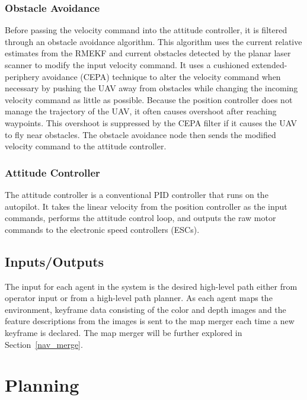 \documentclass[letterpaper, 10 pt, conference]{ieeeconf}  %
\begin{document}
\subsubsection{Obstacle Avoidance} \label{obs_avoid}

Before passing the velocity command into the attitude controller, it is filtered through an obstacle avoidance algorithm. This algorithm uses the current relative estimates from the RMEKF and current obstacles detected by the planar laser scanner to modify the input velocity command. It uses a cushioned extended-periphery avoidance (CEPA) technique \cite{Jackson2016} to alter the velocity command when necessary by pushing the UAV away from obstacles while changing the incoming velocity command as little as possible. Because the position controller does not manage the trajectory of the UAV, it often causes overshoot after reaching waypoints. This overshoot is suppressed by the CEPA filter if it causes the UAV to fly near obstacles. The obstacle avoidance node then sends the modified velocity command to the attitude controller.

\subsubsection{Attitude Controller}

The attitude controller is a conventional PID controller that runs on the autopilot. It takes the linear velocity from the position controller as the input commands, performs the attitude control loop, and outputs the raw motor commands to the electronic speed controllers (ESCs).

\subsection{Inputs/Outputs}

The input for each agent in the system is the desired high-level path either from operator input or from a high-level path planner. As each agent maps the environment, keyframe data consisting of the color and depth images and the  feature descriptions from the images is sent to the map merger each time a new keyframe is declared. The map merger will be further explored in Section~\ref{nav_merge}.

\section{Planning}\label{nav_planning}
\end{document}

